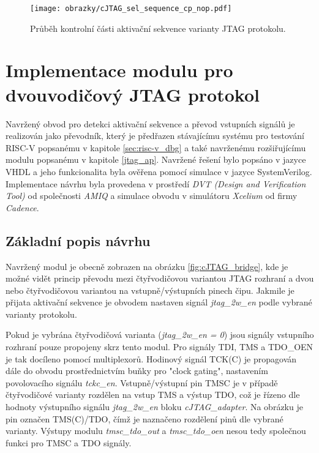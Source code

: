 \begin{figure}[!h]
  \begin{center}
    \texttt{[image: obrazky/cJTAG\_sel\_sequence\_cp\_nop.pdf]}
  \end{center}
  \caption{Průběh kontrolní části aktivační sekvence varianty \acs{JTAG} protokolu.}
	\label{fig:cJTAG_sel_cp_nop}
\end{figure}

\section{Implementace modulu pro dvouvodičový \acs{JTAG} protokol}
Navržený obvod pro detekci aktivační sekvence a převod vstupních signálů je realizován jako převodník, který je předřazen stávajícímu systému pro testování \acs{RISC-V} popsanému v kapitole \ref{sec:risc-v_dbg} a také navrženému rozšiřujícímu modulu popsanému v kapitole \ref{jtag_ap}. Navržené řešení bylo popsáno v jazyce \acs{VHDL} a jeho funkcionalita byla ověřena pomocí simulace v jazyce SystemVerilog. Implementace návrhu byla provedena v prostředí \textit{DVT (Design and Verification Tool)} od společnosti \textit{AMIQ} a simulace obvodu v simulátoru \textit{Xcelium} od firmy \textit{Cadence}.

\subsection{Základní popis návrhu}	\label{subsec:cJTAG_adapter}
Navržený modul je obecně zobrazen na obrázku \ref{fig:cJTAG_bridge}, kde je možné vidět princip převodu mezi čtyřvodičovou variantou \acs{JTAG} rozhraní a dvou nebo čtyřvodičovou variantou na vstupně/výstupních pinech čipu. Jakmile je přijata aktivační sekvence je obvodem nastaven signál \textit{jtag\_2w\_en} podle vybrané varianty protokolu.

Pokud je vybrána čtyřvodičová varianta (\textit{jtag\_2w\_en = 0}) jsou signály vstupního rozhraní pouze propojeny skrz tento modul. Pro signály TDI, TMS a TDO\_OEN je tak docíleno pomocí multiplexorů. Hodinový signál TCK(C) je propagován dále do obvodu prostřednictvím buňky pro "clock gating", nastavením povolovacího signálu \textit{tckc\_en}. Vstupně/výstupní pin \acs{TMSC} je v případě čtyřvodičové varianty rozdělen na vstup TMS a výstup TDO, což je řízeno dle hodnoty výstupního signálu \textit{jtag\_2w\_en} bloku \textit{cJTAG\_adapter}. Na obrázku je pin označen TMS(C)/TDO, čímž je naznačeno rozdělení pinů dle vybrané varianty. Výstupy modulu \textit{tmsc\_tdo\_out} a \textit{tmsc\_tdo\_oen} nesou tedy společnou funkci pro \acs{TMSC} a TDO signály.

